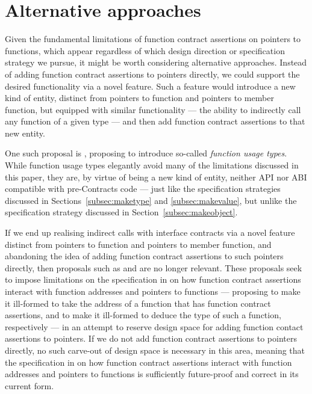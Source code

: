 \section{Alternative approaches}

Given the fundamental limitations of function contract assertions on pointers to functions, which appear regardless of which design direction or specification strategy we pursue, it might be worth considering alternative approaches. Instead of adding function contract assertions to pointers directly, we could support the desired functionality via a novel feature. Such a feature would  introduce a new kind of entity, distinct from pointers to function and pointers to member function, but equipped with similar functionality --- the ability to indirectly call any function of a given type --- and then add function contract assertions to that new entity.

One such proposal is \cite{P3271R0}, proposing to introduce so-called \emph{function usage types}. 
While function usage types elegantly avoid many of the limitations discussed in this paper, they are, by virtue of being a new kind of entity, neither API nor ABI compatible with pre-Contracts code --- just like the specification strategies discussed in Sections~\ref{subsec:maketype} and \ref{subsec:makevalue}, but unlike the specification strategy discussed in Section~\ref{subsec:makeobject}.

If we end up realising indirect calls with interface contracts via a novel feature distinct from pointers to function and pointers to member function, and abandoning the idea of adding function contract assertions to such pointers directly, then proposals such as \cite{P3221R0} and \cite{P3250R0} are no longer relevant. These proposals seek to impose limitations on the specification in \cite{P2900R7} on how function contract assertions interact with function addresses and pointers to functions --- proposing to make it ill-formed to take the address of a function that has function contract assertions, and to make it ill-formed to deduce the type of such a function, respectively --- in an attempt to reserve design space for adding function contact assertions to pointers. If we do not add function contract assertions to pointers directly, no such carve-out of design space is necessary in this area, meaning that the specification in \cite{P2900R7} on how function contract assertions interact with function addresses and pointers to functions is sufficiently future-proof and correct in its current form.

